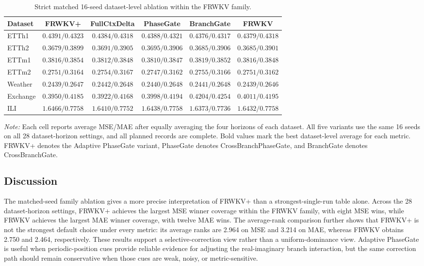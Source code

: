 \documentclass[a4paper,fleqn]{cas-sc}
\begin{document}
\begin{table}[t]
\centering
\caption{Strict matched 16-seed dataset-level ablation within the FRWKV family.}
\label{tab:ablation}
\scriptsize
\setlength{\tabcolsep}{3pt}
\begin{tabular}{lccccc}
\toprule
Dataset & FRWKV+ & FullCtxDelta & PhaseGate & BranchGate & FRWKV \\
\midrule
ETTh1 & $0.4391/0.4323$ & $0.4384/0.4318$ & $0.4388/0.4321$ & $\mathbf{0.4376}/\mathbf{0.4317}$ & $0.4379/0.4318$ \\
ETTh2 & $\mathbf{0.3679}/\mathbf{0.3899}$ & $0.3691/0.3905$ & $0.3695/0.3906$ & $0.3685/0.3906$ & $0.3685/0.3901$ \\
ETTm1 & $0.3816/0.3854$ & $0.3812/0.3848$ & $\mathbf{0.3810}/\mathbf{0.3847}$ & $0.3819/0.3852$ & $0.3816/0.3848$ \\
ETTm2 & $0.2751/0.3164$ & $0.2754/0.3167$ & $\mathbf{0.2747}/0.3162$ & $0.2755/0.3166$ & $0.2751/\mathbf{0.3162}$ \\
Weather & $0.2439/0.2647$ & $0.2442/0.2648$ & $0.2440/0.2648$ & $0.2441/0.2648$ & $\mathbf{0.2439}/\mathbf{0.2646}$ \\
Exchange & $0.3950/0.4185$ & $\mathbf{0.3922}/\mathbf{0.4168}$ & $0.3998/0.4194$ & $0.4204/0.4254$ & $0.4011/0.4195$ \\
ILI & $1.6466/0.7758$ & $1.6410/0.7752$ & $1.6438/0.7758$ & $\mathbf{1.6373}/\mathbf{0.7736}$ & $1.6432/0.7758$ \\
\bottomrule
\end{tabular}
\par\smallskip
\begin{minipage}{\textwidth}
\footnotesize \emph{Note:} Each cell reports average MSE/MAE after equally averaging the four horizons of each dataset. All five variants use the same 16 seeds on all 28 dataset-horizon settings, and all planned records are complete. Bold values mark the best dataset-level average for each metric. FRWKV+ denotes the Adaptive PhaseGate variant, PhaseGate denotes CrossBranchPhaseGate, and BranchGate denotes CrossBranchGate.
\end{minipage}
\end{table}

\subsection{Discussion}
The matched-seed family ablation gives a more precise interpretation of FRWKV+ than a strongest-single-run table alone. Across the 28 dataset-horizon settings, FRWKV+ achieves the largest MSE winner coverage within the FRWKV family, with eight MSE wins, while FRWKV achieves the largest MAE winner coverage, with twelve MAE wins. The average-rank comparison further shows that FRWKV+ is not the strongest default choice under every metric: its average ranks are 2.964 on MSE and 3.214 on MAE, whereas FRWKV obtains 2.750 and 2.464, respectively. These results support a selective-correction view rather than a uniform-dominance view. Adaptive PhaseGate is useful when periodic-position cues provide reliable evidence for adjusting the real-imaginary branch interaction, but the same correction path should remain conservative when those cues are weak, noisy, or metric-sensitive.
\end{document}
